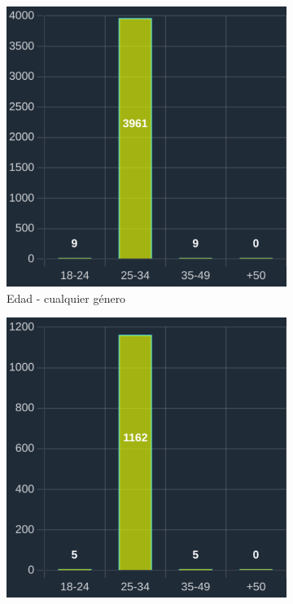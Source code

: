\begin{figure}[H]
  \centering
  \begin{subfigure}{0.3\textwidth}
   \includegraphics[width=\textwidth]{imaxes/capturas-app/graficos/modaresi/grafico-edad-moda.png}
  \caption{Edad - cualquier género}
  \label{subfig:blm/resultados-edad-moda}
  \end{subfigure}
  \begin{subfigure}{0.3\textwidth}
   \includegraphics[width=\textwidth]{imaxes/capturas-app/graficos/modaresi/grafico-edad-moda-fem.png}

\end{subfigure}
\end{figure}
